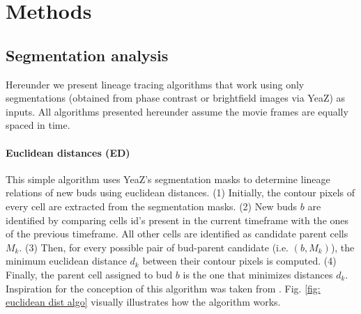 \documentclass{TP}
\begin{document}
\section{Methods}
\label{Methods}
\subsection{Segmentation analysis}
Hereunder we present lineage tracing algorithms that work using only segmentations (obtained from phase contrast or brightfield images via YeaZ) as inputs. All algorithms presented hereunder assume the movie frames are equally spaced in time.

\paragraph{Euclidean distances (ED)}
This simple algorithm uses YeaZ's segmentation masks to determine lineage relations of new buds using euclidean distances. (1) Initially, the contour pixels of every cell are extracted from the segmentation masks. (2) New buds $b$ are identified by comparing cells id's  present in the current timeframe with the ones of the previous timeframe. All other cells are identified as candidate parent cells $M_k$. (3) Then, for every possible pair of bud-parent candidate (i.e. $(b,M_k)$), the minimum euclidean distance $d_{k}$ between their contour pixels is computed. (4) Finally, the parent cell assigned to bud $b$ is the one that minimizes distances $d_{k}$. Inspiration for the conception of this algorithm was taken from \cite{cell-acdc}. Fig. \ref{fig: euclidean dist algo} visually illustrates how the algorithm works.
\end{document}

